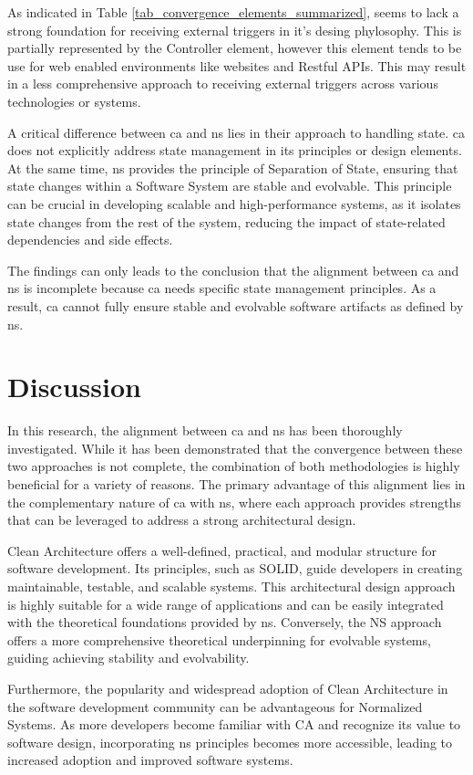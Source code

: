 As indicated in Table \ref{tab_convergence_elements_summarized}, seems to lack a strong
foundation for receiving external triggers in it's desing phylosophy. This is partially
represented by the Controller element, however this element tends to be use for web
enabled environments like websites and Restful APIs. This may result in a less
comprehensive approach to receiving external triggers across various technologies or
systems.

A critical difference between \gls{ca} and \gls{ns} lies in their approach to handling
state. \gls{ca} does not explicitly address state management in its principles or design
elements. At the same time, \gls{ns} provides the principle of Separation of State,
ensuring that state changes within a Software System are stable and evolvable. This
principle can be crucial in developing scalable and high-performance systems, as it
isolates state changes from the rest of the system, reducing the impact of state-related
dependencies and side effects. 

The findings can only leads to the conclusion that the alignment between \gls{ca} and
\gls{ns} is incomplete because \gls{ca} needs specific state management principles. As a
result, \gls{ca} cannot fully ensure stable and evolvable software artifacts as defined by
\gls{ns}.


\section{Discussion}

In this research, the alignment between \gls{ca} and \gls{ns} has been thoroughly
investigated. While it has been demonstrated that the convergence between these two
approaches is not complete, the combination of both methodologies is highly beneficial for
a variety of reasons. The primary advantage of this alignment lies in the complementary
nature of \gls{ca} with \gls{ns}, where each approach provides strengths that can be
leveraged to address a strong architectural design. 

Clean Architecture offers a well-defined, practical, and modular structure for software
development. Its principles, such as SOLID, guide developers in creating maintainable,
testable, and scalable systems. This architectural design approach is highly suitable for
a wide range of applications and can be easily integrated with the theoretical foundations
provided by \gls{ns}. Conversely, the NS approach offers a more comprehensive theoretical
underpinning for evolvable systems, guiding achieving stability and evolvability.

Furthermore, the popularity and widespread adoption of Clean Architecture in the software
development community can be advantageous for Normalized Systems. As more developers
become familiar with CA and recognize its value to software design, incorporating \gls{ns}
principles becomes more accessible, leading to increased adoption and improved software
systems.



